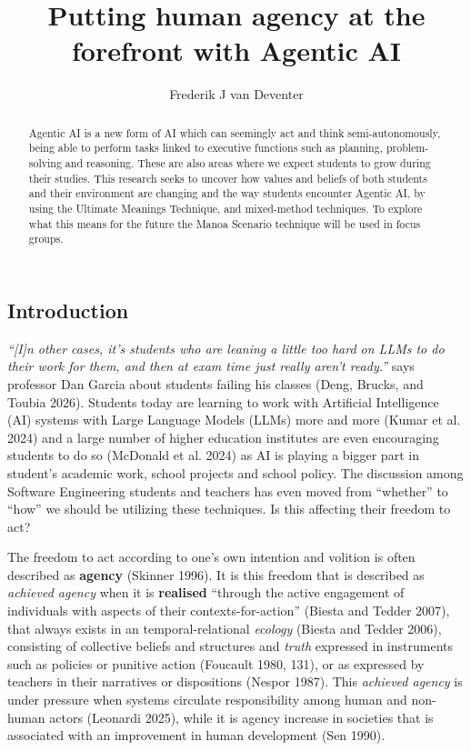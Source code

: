 \documentclass[
  letterpaper,
  DIV=11,
  numbers=noendperiod]{scrartcl}
\title{Putting human agency at the forefront with Agentic AI}
\author{Frederik J van Deventer}
\date{}
\begin{document}
\maketitle
\begin{abstract}
Agentic AI is a new form of AI which can seemingly act and think
semi-autonomously, being able to perform tasks linked to executive
functions such as planning, problem-solving and reasoning. These are
also areas where we expect students to grow during their studies. This
research seeks to uncover how values and beliefs of both students and
their environment are changing and the way students encounter Agentic
AI, by using the Ultimate Meanings Technique, and mixed-method
techniques. To explore what this means for the future the Manoa Scenario
technique will be used in focus groups.
\end{abstract}


\subsection{Introduction}\label{introduction}

\emph{``{[}I{]}n other cases, it's students who are leaning a little too
hard on LLMs to do their work for them, and then at exam time just
really aren't ready.''} says professor Dan Garcia about students failing
his classes (Deng, Brucks, and Toubia 2026). Students today are learning
to work with Artificial Intelligence (AI) systems with Large Language
Models (LLMs) more and more (Kumar et al. 2024) and a large number of
higher education institutes are even encouraging students to do so
(McDonald et al. 2024) as AI is playing a bigger part in student's
academic work, school projects and school policy. The discussion among
Software Engineering students and teachers has even moved from
``whether'' to ``how'' we should be utilizing these techniques. Is this
affecting their freedom to act?

The freedom to act according to one's own intention and volition is
often described as \textbf{agency} (Skinner 1996). It is this freedom
that is described as \emph{achieved agency} when it is \textbf{realised}
``through the active engagement of individuals with aspects of their
contexts-for-action'' (Biesta and Tedder 2007), that always exists in an
temporal-relational \emph{ecology} (Biesta and Tedder 2006), consisting
of collective beliefs and structures and \emph{truth} expressed in
instruments such as policies or punitive action (Foucault 1980, 131), or
as expressed by teachers in their narratives or dispositions (Nespor
1987). This \emph{achieved agency} is under pressure when systems
circulate responsibility among human and non-human actors (Leonardi
2025), while it is agency increase in societies that is associated with
an improvement in human development (Sen 1990).
\end{document}
